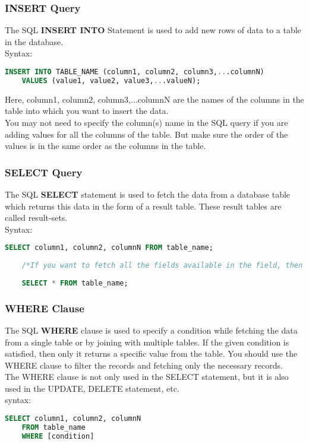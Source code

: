  \subsubsection*{{INSERT Query}}
 The SQL \textbf{INSERT INTO} Statement is used to add new rows of data to a table in the database.\\
 Syntax: 
 \begin{lstlisting}[language=SQL]
    INSERT INTO TABLE_NAME (column1, column2, column3,...columnN)  
    VALUES (value1, value2, value3,...valueN);
 \end{lstlisting}
 Here, column1, column2, column3,...columnN are the names of the columns in the table into which you want to insert the data.\\
 You may not need to specify the column(s) name in the SQL query if you are adding values for all the columns of the table. But make sure the order of the values is in the same order as the columns in the table.
 
 \subsubsection*{{SELECT Query}}
 The SQL \textbf{SELECT} statement is used to fetch the data from a database table which returns this data in the form of a result table. These result tables are called result-sets.\\
 Syntax: 
 \begin{lstlisting}[language=SQL]
    SELECT column1, column2, columnN FROM table_name;
    
    /*If you want to fetch all the fields available in the field, then you can use the following syntax.*/
    
    SELECT * FROM table_name;
 \end{lstlisting}
 
 \subsubsection*{{WHERE Clause}}
 The SQL \textbf{WHERE} clause is used to specify a condition while fetching the data from a single table or by joining with multiple tables. If the given condition is satisfied, then only it returns a specific value from the table. You should use the WHERE clause to filter the records and fetching only the necessary records.\\
 The WHERE clause is not only used in the SELECT statement, but it is also used in the UPDATE, DELETE statement, etc.\\
 syntax: 
 \begin{lstlisting}[language=SQL]
    SELECT column1, column2, columnN 
    FROM table_name
    WHERE [condition]
 \end{lstlisting}
 
